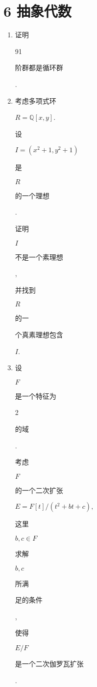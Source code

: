 \documentclass[10pt]{article}
\begin{document}
\section{6 抽象代数}
\begin{enumerate}
  \item \begin{CJK}{UTF8}{mj}证明\end{CJK} 91 \begin{CJK}{UTF8}{mj}阶群都是循环群\end{CJK}.

  \item \begin{CJK}{UTF8}{mj}考虑多项式环\end{CJK} $R=\mathbb{Q}[x, y]$. \begin{CJK}{UTF8}{mj}设\end{CJK} $I=\left(x^{2}+1, y^{2}+1\right)$ \begin{CJK}{UTF8}{mj}是\end{CJK} $R$ \begin{CJK}{UTF8}{mj}的一个理想\end{CJK}. \begin{CJK}{UTF8}{mj}证明\end{CJK} $I$ \begin{CJK}{UTF8}{mj}不是一个素理想\end{CJK}, \begin{CJK}{UTF8}{mj}并找到\end{CJK} $R$ \begin{CJK}{UTF8}{mj}的一\end{CJK} \begin{CJK}{UTF8}{mj}个真素理想包含\end{CJK} $I$.

  \item \begin{CJK}{UTF8}{mj}设\end{CJK} $F$ \begin{CJK}{UTF8}{mj}是一个特征为\end{CJK} 2 \begin{CJK}{UTF8}{mj}的域\end{CJK}. \begin{CJK}{UTF8}{mj}考虑\end{CJK} $F$ \begin{CJK}{UTF8}{mj}的一个二次扩张\end{CJK} $E=F[t] /\left(t^{2}+b t+c\right), \quad$ \begin{CJK}{UTF8}{mj}这里\end{CJK} $b, c \in F$ \begin{CJK}{UTF8}{mj}求解\end{CJK} $b, c$ \begin{CJK}{UTF8}{mj}所满\end{CJK} \begin{CJK}{UTF8}{mj}足的条件\end{CJK}, \begin{CJK}{UTF8}{mj}使得\end{CJK} $E / F$ \begin{CJK}{UTF8}{mj}是一个二次伽罗瓦扩张\end{CJK}.

\end{enumerate}
\end{document}
